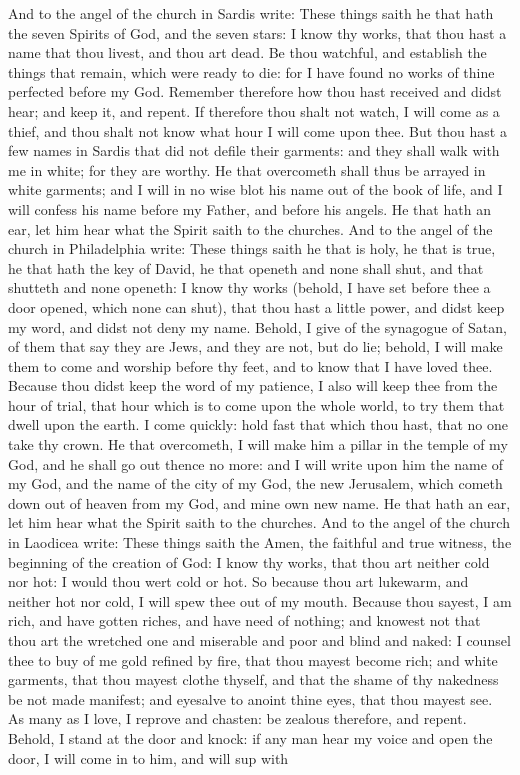 And to the angel of the church in Sardis write: These things saith he that hath the seven Spirits of God, and the seven stars: I know thy works, that thou hast a name that thou livest, and thou art dead. Be thou watchful, and establish the things that remain, which were ready to die: for I have found no works of thine perfected before my God. Remember therefore how thou hast received and didst hear; and keep it, and repent. If therefore thou shalt not watch, I will come as a thief, and thou shalt not know what hour I will come upon thee. But thou hast a few names in Sardis that did not defile their garments: and they shall walk with me in white; for they are worthy. He that overcometh shall thus be arrayed in white garments; and I will in no wise blot his name out of the book of life, and I will confess his name before my Father, and before his angels. He that hath an ear, let him hear what the Spirit saith to the churches.  And to the angel of the church in Philadelphia write: These things saith he that is holy, he that is true, he that hath the key of David, he that openeth and none shall shut, and that shutteth and none openeth: I know thy works (behold, I have set before thee a door opened, which none can shut), that thou hast a little power, and didst keep my word, and didst not deny my name. Behold, I give of the synagogue of Satan, of them that say they are Jews, and they are not, but do lie; behold, I will make them to come and worship before thy feet, and to know that I have loved thee. Because thou didst keep the word of my patience, I also will keep thee from the hour of trial, that hour which is to come upon the whole world, to try them that dwell upon the earth. I come quickly: hold fast that which thou hast, that no one take thy crown. He that overcometh, I will make him a pillar in the temple of my God, and he shall go out thence no more: and I will write upon him the name of my God, and the name of the city of my God, the new Jerusalem, which cometh down out of heaven from my God, and mine own new name. He that hath an ear, let him hear what the Spirit saith to the churches.  And to the angel of the church in Laodicea write: These things saith the Amen, the faithful and true witness, the beginning of the creation of God: I know thy works, that thou art neither cold nor hot: I would thou wert cold or hot. So because thou art lukewarm, and neither hot nor cold, I will spew thee out of my mouth. Because thou sayest, I am rich, and have gotten riches, and have need of nothing; and knowest not that thou art the wretched one and miserable and poor and blind and naked: I counsel thee to buy of me gold refined by fire, that thou mayest become rich; and white garments, that thou mayest clothe thyself, and that the shame of thy nakedness be not made manifest; and eyesalve to anoint thine eyes, that thou mayest see. As many as I love, I reprove and chasten: be zealous therefore, and repent. Behold, I stand at the door and knock: if any man hear my voice and open the door, I will come in to him, and will sup with 